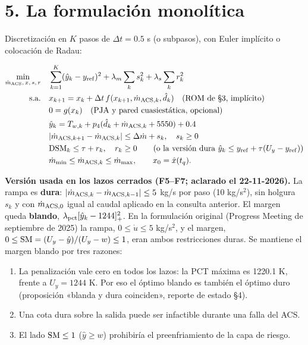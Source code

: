 \documentclass[11pt,a4paper]{article}
\begin{document}
\medskip
\section*{5. La formulación monolítica}
Discretización en $K$ pasos de $\Delta t=0.5$ s (o subpasos), con Euler implícito o colocación de Radau:

\[
\begin{aligned}
\min_{\dot m_{\rm ACS},\,x,\,s,\,r}\quad & \sum_{k=1}^{K}(\hat y_k-y_{\rm ref})^2+\lambda_m\sum_k s_k^2+\lambda_s\sum_k r_k^2\\
\text{s.a.}\quad & x_{k+1}=x_k+\Delta t\,f(x_{k+1},\dot m_{{\rm ACS},k},\hat d_k)\quad\text{(ROM de §3, implícito)}\\
& 0=g(x_k)\quad\text{(PJA y pared cuasiestática, opcional)}\\
& \hat y_k=T_{w,k}+p_4(\hat d_k+\dot m_{{\rm ACS},k}+5550)+0.4\\
& \lvert\dot m_{{\rm ACS},k+1}-\dot m_{{\rm ACS},k}\rvert\le\Delta\dot m+s_k,\quad s_k\ge0\\
& \mathrm{DSM}_k\le\tau+r_k,\quad r_k\ge0\qquad(\text{o la versión dura }\hat y_k\le y_{\rm ref}+\tau(U_y-y_{\rm ref}))\\
& \dot m_{\min}\le\dot m_{{\rm ACS},k}\le\dot m_{\max},\qquad x_0=\hat x(t_q).
\end{aligned}
\]

\textbf{Versión usada en los lazos cerrados (F5–F7; aclarado el 22-11-2026).} La rampa es \textbf{dura}: $\lvert\dot m_{{\rm ACS},k}-\dot m_{{\rm ACS},k-1}\rvert\le5$ kg/s por paso (10 kg/s$^{2}$), sin holgura $s_k$ y con $\dot m_{{\rm ACS},0}$ igual al caudal aplicado en la consulta anterior. El margen queda \textbf{blando}, $\lambda_{\rm pct}[\hat y_k-1244]_+^2$. En la formulación original (Progress Meeting de septiembre de 2025) la rampa, $0\le\dot u\le5$ kg/s$^{2}$, y el margen, $0\le{\rm SM}=(U_y-\hat y)/(U_y-w)\le1$, eran ambos restricciones duras. Se mantiene el margen blando por tres razones:

\begin{enumerate}
\item La penalización vale cero en todos los lazos: la PCT máxima es 1220.1 K, frente a $U_y=1244$ K. Por eso el óptimo blando es también el óptimo duro (proposición «blanda y dura coinciden», reporte de estado \S{}4).
\item Una cota dura sobre la salida puede ser infactible durante una falla del ACS.
\item El lado ${\rm SM}\le1$ ($\hat y\ge w$) prohibiría el preenfriamiento de la capa de riesgo.
\end{enumerate}
\end{document}
